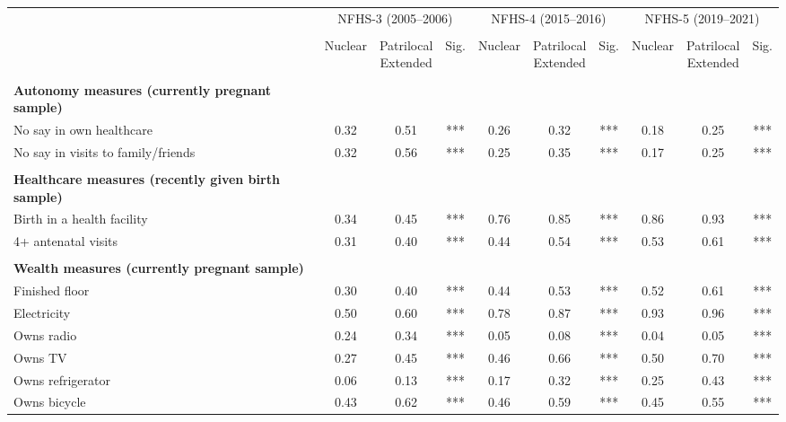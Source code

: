 \begin{tabular}{lccccccccc}
\toprule
 & \multicolumn{3}{c}{NFHS-3 (2005--2006)} & \multicolumn{3}{c}{NFHS-4 (2015--2016)} & \multicolumn{3}{c}{NFHS-5 (2019--2021)} \\\\
\cmidrule(lr){2-4} \cmidrule(lr){5-7} \cmidrule(lr){8-10}
 & Nuclear & \shortstack{Patrilocal\\Extended} & Sig. & Nuclear & \shortstack{Patrilocal\\Extended} & Sig. & Nuclear & \shortstack{Patrilocal\\Extended} & Sig. \\\\
\midrule
\textbf{Autonomy measures (currently pregnant sample)}&&&&&&&&&\\
\hspace*{2em}No say in own healthcare&0.32&0.51&***&0.26&0.32&***&0.18&0.25&***\\
\hspace*{2em}No say in visits to family/friends&0.32&0.56&***&0.25&0.35&***&0.17&0.25&***\\
&&&&&&&&&\\
\textbf{Healthcare measures (recently given birth sample)}&&&&&&&&&\\
\hspace*{2em}Birth in a health facility&0.34&0.45&***&0.76&0.85&***&0.86&0.93&***\\
\hspace*{2em}4+ antenatal visits&0.31&0.40&***&0.44&0.54&***&0.53&0.61&***\\
&&&&&&&&&\\
\textbf{Wealth measures (currently pregnant sample)}&&&&&&&&&\\
\hspace*{2em}Finished floor&0.30&0.40&***&0.44&0.53&***&0.52&0.61&***\\
\hspace*{2em}Electricity&0.50&0.60&***&0.78&0.87&***&0.93&0.96&***\\
\hspace*{2em}Owns radio&0.24&0.34&***&0.05&0.08&***&0.04&0.05&***\\
\hspace*{2em}Owns TV&0.27&0.45&***&0.46&0.66&***&0.50&0.70&***\\
\hspace*{2em}Owns refrigerator&0.06&0.13&***&0.17&0.32&***&0.25&0.43&***\\
\hspace*{2em}Owns bicycle&0.43&0.62&***&0.46&0.59&***&0.45&0.55&***\\

\end{tabular}
